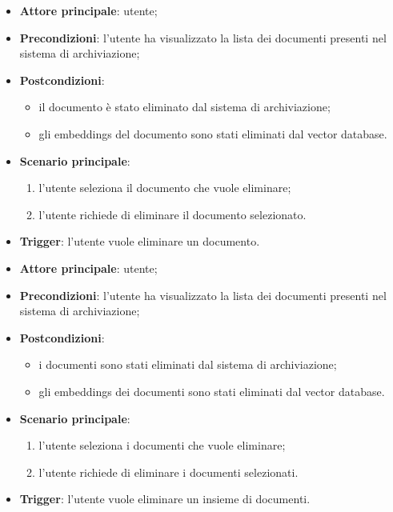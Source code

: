 \documentclass[10pt, a4paper]{article}
\begin{document}
    \begin{itemize}
        \item \textbf{Attore principale}: utente;
        \item \textbf{Precondizioni}: l’utente ha visualizzato la lista dei documenti presenti nel sistema di archiviazione;
        \item \textbf{Postcondizioni}:
        \begin{itemize}
            \item il documento è stato eliminato dal sistema di archiviazione;
            \item gli embeddings del documento sono stati eliminati dal vector database.
        \end{itemize}
        \item \textbf{Scenario principale}:
            \begin{enumerate}
                \item l’utente seleziona il documento che vuole eliminare;
                \item l’utente richiede di eliminare il documento selezionato.
            \end{enumerate}
        \item \textbf{Trigger}: l’utente vuole eliminare un documento.
    \end{itemize}

    \begin{itemize}
        \item \textbf{Attore principale}: utente;
        \item \textbf{Precondizioni}: l’utente ha visualizzato la lista dei documenti presenti nel sistema di archiviazione;
        \item \textbf{Postcondizioni}:
        \begin{itemize}
            \item i documenti sono stati eliminati dal sistema di archiviazione;
            \item gli embeddings dei documenti sono stati eliminati dal vector database.
        \end{itemize}
        \item \textbf{Scenario principale}:
            \begin{enumerate}
                \item l’utente seleziona i documenti che vuole eliminare;
                \item l’utente richiede di eliminare i documenti selezionati.
            \end{enumerate}
        \item \textbf{Trigger}: l’utente vuole eliminare un insieme di documenti.
    \end{itemize}
\end{document}
